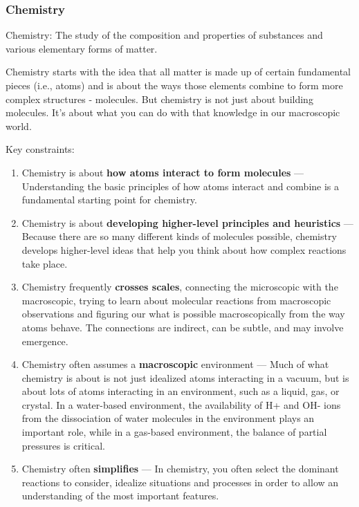 \subsubsection{Chemistry}
Chemistry: The study of the composition and properties of substances and various elementary forms of matter.

Chemistry starts with the idea that all matter is made up of certain fundamental pieces (i.e., atoms) and is about the ways those elements combine to form more complex structures - molecules. But chemistry is not just about building molecules. It's about what you can do with that knowledge in our macroscopic world.

Key constraints:
\begin{enumerate}
\item Chemistry is about {\bf how atoms interact to form molecules} --- Understanding the basic principles of how atoms interact and combine is a fundamental starting point for chemistry.

\item Chemistry is about {\bf developing higher-level principles and heuristics} --- Because there are so many different kinds of molecules possible, chemistry develops higher-level ideas that help you think about how complex reactions take place.

\item Chemistry frequently {\bf crosses scales}, connecting the microscopic with the macroscopic, trying to learn about molecular reactions from macroscopic observations and figuring our what is possible macroscopically from the way atoms behave. The connections are indirect, can be subtle, and may involve emergence.

\item Chemistry often assumes a {\bf macroscopic} environment --- Much of what chemistry is about is not just idealized atoms interacting in a vacuum, but is about lots of atoms interacting in an environment, such as a liquid, gas, or crystal. In a water-based environment, the availability of H+ and OH- ions from the dissociation of water molecules in the environment plays an important role, while in a gas-based environment, the balance of partial pressures is critical.

\item Chemistry often {\bf simplifies} --- In chemistry, you often select the dominant reactions to consider, idealize situations and processes in order to allow an understanding of the most important features.

\end{enumerate}

